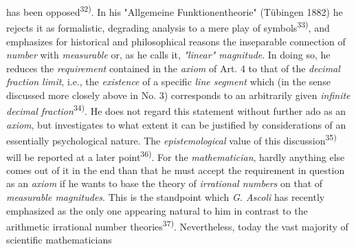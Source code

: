 \thispagestyle{fancy}

\vspace{0.5cm}

has been opposed\textsuperscript{32)}. In his "Allgemeine Funktionentheorie" (Tübingen 1882) he rejects it as formalistic, degrading analysis to a mere play of symbols\textsuperscript{33)}, and emphasizes for historical and philosophical reasons the inseparable connection of \textit{number} with \textit{measurable} or, as he calls it, \textit{"linear" magnitude}. In doing so, he reduces the \textit{requirement} contained in the \textit{axiom} of Art. 4 to that of the \textit{decimal fraction limit}, i.e., the \textit{existence} of a specific \textit{line segment} which (in the sense discussed more closely above in No. 3) corresponds to an arbitrarily given \textit{infinite decimal fraction}\textsuperscript{34)}. He does not regard this statement without further ado as an \textit{axiom}, but investigates to what extent it can be justified by considerations of an essentially psychological nature. The \textit{epistemological} value of this discussion\textsuperscript{35)} will be reported at a later point\textsuperscript{36)}. For the \textit{mathematician}, hardly anything else comes out of it in the end than that he must accept the requirement in question as an \textit{axiom} if he wants to base the theory of \textit{irrational numbers} on that of \textit{measurable magnitudes}. This is the standpoint which \textit{G. Ascoli} has recently emphasized as the only one appearing natural to him in contrast to the arithmetic irrational number theories\textsuperscript{37)}. Nevertheless, today the vast majority of scientific mathematicians

